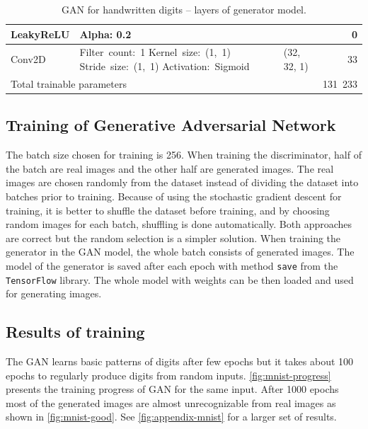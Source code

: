\begin{table}
\begin{center}
\begin{tabular}{ |m{8em}|m{8.8em}|l|r| }
                LeakyReLU & Alpha: 0.2 & & 0 \\
            \hline
                Conv2D & \mbox{Filter count: 1} \mbox{Kernel size: (1, 1)} \mbox{Stride size: (1, 1)} \mbox{Activation: Sigmoid} & (32, 32, 1) & 33 \\
            \hline
            \hline
                \multicolumn{3}{|l|}{Total trainable parameters} & 131~233 \\
            \hline
        \end{tabular}
    \end{center}
    \caption{\label{tab:gan-mnist-generator}GAN for handwritten digits – layers of generator model.}
\end{table}

\newpage
\subsection*{Training of Generative Adversarial Network}
The batch size chosen for training is 256. When training the discriminator, half of the batch are real images and the other half are generated images. The real images are chosen randomly from the dataset instead of dividing the dataset into batches prior to training. Because of using the stochastic gradient descent for training, it is better to shuffle the dataset before training, and by choosing random images for each batch, shuffling is done automatically. Both approaches are correct but the random selection is a simpler solution. When training the generator in the GAN model, the whole batch consists of generated images. The model of the generator is saved after each epoch with method \texttt{save} from the \texttt{TensorFlow} library. The whole model with weights can be then loaded and used for generating images.

\subsection*{Results of training}
The GAN learns basic patterns of digits after few epochs but it takes about 100 epochs to regularly produce digits from random inputs. \autoref{fig:mnist-progress} presents the training progress of GAN for the same input. After 1000 epochs most of the generated images are almost unrecognizable from real images as shown in \autoref{fig:mnist-good}. See \autoref{fig:appendix-mnist} for a larger set of results.

